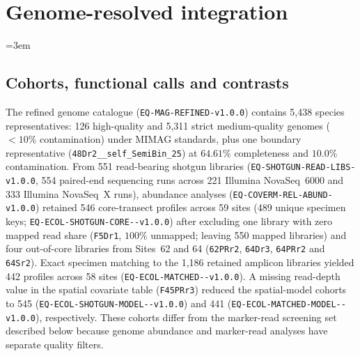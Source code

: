 \clearpage
\section{Genome-resolved integration}\label{sup:mag_integration}
{\emergencystretch=3em
\subsection{Cohorts, functional calls and contrasts}
The refined genome catalogue (\texttt{EQ-\allowbreak MAG-\allowbreak REFINED-\allowbreak v1.0.0}) contains 5,438 species representatives: 126 high-quality and 5,311 strict medium-quality genomes ($<10\%$ contamination) under MIMAG standards, plus one boundary representative (\texttt{48Dr2\_\_\allowbreak self\_\allowbreak SemiBin\_25}) at $64.61\%$ completeness and $10.0\%$ contamination. From 551 read-bearing shotgun libraries (\texttt{EQ-\allowbreak SHOTGUN-\allowbreak READ-\allowbreak LIBS-\allowbreak v1.0.0}, 554 paired-end sequencing runs across 221 Illumina NovaSeq~6000 and 333 Illumina NovaSeq~X runs), abundance analyses (\texttt{EQ-\allowbreak COVERM-\allowbreak REL-\allowbreak ABUND-\allowbreak v1.0.0}) retained 546 core-transect profiles across 59 sites (489 unique specimen keys; \texttt{EQ-\allowbreak ECOL-\allowbreak SHOTGUN-\allowbreak CORE--\allowbreak v1.0.0}) after excluding one library with zero mapped read share (\texttt{F5Dr1}, $100\%$ unmapped; leaving 550 mapped libraries) and four out-of-core libraries from Sites~62 and 64 (\texttt{62PRr2}, \texttt{64Dr3}, \texttt{64PRr2} and \texttt{64Sr2}). Exact specimen matching to the 1,186 retained amplicon libraries yielded 442 profiles across 58 sites (\texttt{EQ-\allowbreak ECOL-\allowbreak MATCHED--\allowbreak v1.0.0}). A missing read-depth value in the spatial covariate table (\texttt{F45PRr3}) reduced the spatial-model cohorts to 545 (\texttt{EQ-\allowbreak ECOL-\allowbreak SHOTGUN-\allowbreak MODEL--\allowbreak v1.0.0}) and 441 (\texttt{EQ-\allowbreak ECOL-\allowbreak MATCHED-\allowbreak MODEL--\allowbreak v1.0.0}), respectively. These cohorts differ from the marker-read screening set described below because genome abundance and marker-read analyses have separate quality filters.

}
